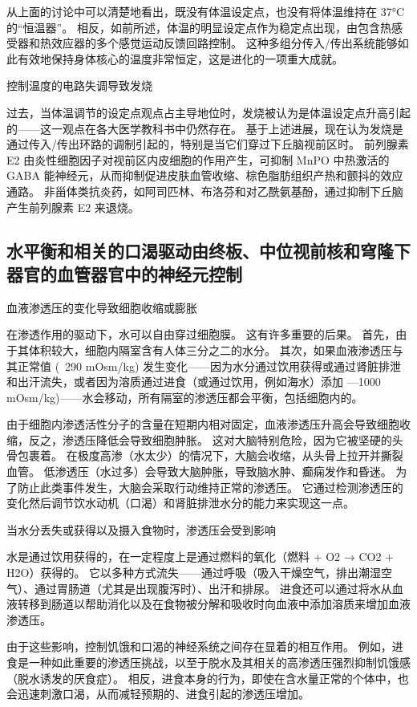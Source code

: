 从上面的讨论中可以清楚地看出，既没有体温设定点，也没有将体温维持在 37°C 的“恒温器”。 相反，如前所述，体温的明显设定点作为稳定点出现，由包含热感受器和热效应器的多个感觉运动反馈回路控制。 这种多组分传入/传出系统能够如此有效地保持身体核心的温度非常恒定，这是进化的一项重大成就。

控制温度的电路失调导致发烧

过去，当体温调节的设定点观点占主导地位时，发烧被认为是体温设定点升高引起的——这一观点在各大医学教科书中仍然存在。 基于上述进展，现在认为发烧是通过传入/传出环路的调制引起的，特别是当它们穿过下丘脑视前区时。 前列腺素 E2 由炎性细胞因子对视前区内皮细胞的作用产生，可抑制 MnPO 中热激活的 GABA 能神经元，从而抑制促进皮肤血管收缩、棕色脂肪组织产热和颤抖的效应通路。 非甾体类抗炎药，如阿司匹林、布洛芬和对乙酰氨基酚，通过抑制下丘脑产生前列腺素 E2 来退烧。

\subsection{水平衡和相关的口渴驱动由终板、中位视前核和穹隆下器官的血管器官中的神经元控制}
血液渗透压的变化导致细胞收缩或膨胀

在渗透作用的驱动下，水可以自由穿过细胞膜。 这有许多重要的后果。 首先，由于其体积较大，细胞内隔室含有人体三分之二的水分。 其次，如果血液渗透压与其正常值 (~290 mOsm/kg) 发生变化——因为水分通过饮用获得或通过肾脏排泄和出汗流失，或者因为溶质通过进食（或通过饮用，例如海水）添加 —1000 mOsm/kg)——水会移动，所有隔室的渗透压都会平衡，包括细胞内的。

由于细胞内渗透活性分子的含量在短期内相对固定，血液渗透压升高会导致细胞收缩，反之，渗透压降低会导致细胞肿胀。 这对大脑特别危险，因为它被坚硬的头骨包裹着。 在极度高渗（水太少）的情况下，大脑会收缩，从头骨上拉开并撕裂血管。 低渗透压（水过多）会导致大脑肿胀，导致脑水肿、癫痫发作和昏迷。 为了防止此类事件发生，大脑会采取行动维持正常的渗透压。 它通过检测渗透压的变化然后调节饮水动机（口渴）和肾脏排泄水分的能力来实现这一点。

当水分丢失或获得以及摄入食物时，渗透压会受到影响

水是通过饮用获得的，在一定程度上是通过燃料的氧化（燃料 + O2 → CO2 + H2O）获得的。 它以多种方式流失——通过呼吸（吸入干燥空气，排出潮湿空气）、通过胃肠道（尤其是出现腹泻时）、出汗和排尿。 进食还可以通过将水从血液转移到肠道以帮助消化以及在食物被分解和吸收时向血液中添加溶质来增加血液渗透压。

由于这些影响，控制饥饿和口渴的神经系统之间存在显着的相互作用。 例如，进食是一种如此重要的渗透压挑战，以至于脱水及其相关的高渗透压强烈抑制饥饿感（脱水诱发的厌食症）。 相反，进食本身的行为，即使在含水量正常的个体中，也会迅速刺激口渴，从而减轻预期的、进食引起的渗透压增加。

